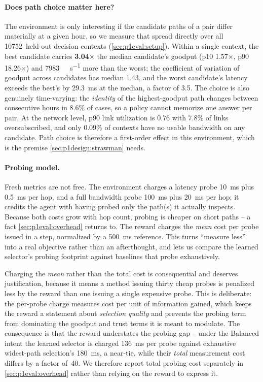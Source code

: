 \paragraph{Does path choice matter here?} The environment is only interesting if the candidate paths of
a pair differ materially at a given hour, so we measure that spread directly over all 10752~held-out
decision contexts (\cref{sec:p1eval:setup}). Within a single context, the best candidate carries
\textbf{3.04$\times$} the median candidate's goodput (p10 1.57$\times$, p90 18.26$\times$) and
\SI{7983}{\mega\bit\per\second} more than the worst; the coefficient of variation of goodput across
candidates has median 1.43, and the worst candidate's latency exceeds the best's by
\SI{29.3}{\milli\second} at the median, a factor of 3.5. The choice is also genuinely time-varying: the
\emph{identity} of the highest-goodput path changes between consecutive hours in 8.6\% of cases, so a
policy cannot memorize one answer per pair. At the network level, p90 link utilization is 0.76 with
7.8\% of links oversubscribed, and only 0.09\% of contexts have no usable bandwidth on any candidate.
Path choice is therefore a first-order effect in this environment, which is the premise
\cref{sec:p1design:strawman} needs.

\paragraph{Probing model.} Fresh metrics are not free. The environment charges a latency probe
\SI{10}{\milli\second} plus \SI{0.5}{\milli\second} per hop, and a full bandwidth probe
\SI{100}{\milli\second} plus \SI{20}{\milli\second} per hop; it credits the agent with having probed
only the path(s) it actually inspects. Because both costs grow with hop count, probing is cheaper on
short paths -- a fact \cref{sec:p1eval:overhead} returns to. The reward charges the \emph{mean} cost per
probe issued in a step, normalized by a \SI{500}{\milli\second} reference. This turns ``measure less''
into a real objective rather than an afterthought, and lets us compare the learned selector's probing
footprint against baselines that probe exhaustively.

Charging the \emph{mean} rather than the total cost is consequential and deserves justification, because
it means a method issuing thirty cheap probes is penalized less by the reward than one issuing a single
expensive probe. This is deliberate: the per-probe charge measures cost per unit of information gained,
which keeps the reward a statement about \emph{selection quality} and prevents the probing term from
dominating the goodput and trust terms it is meant to modulate. The consequence is that the reward
understates the probing gap -- under the Balanced intent the learned selector is charged
\SI{136}{\milli\second} per probe against exhaustive widest-path selection's
\SI{180}{\milli\second}, a near-tie, while their \emph{total} measurement cost differs by a factor
of~40. We therefore report total probing cost separately in \cref{sec:p1eval:overhead} rather than
relying on the reward to express it.

